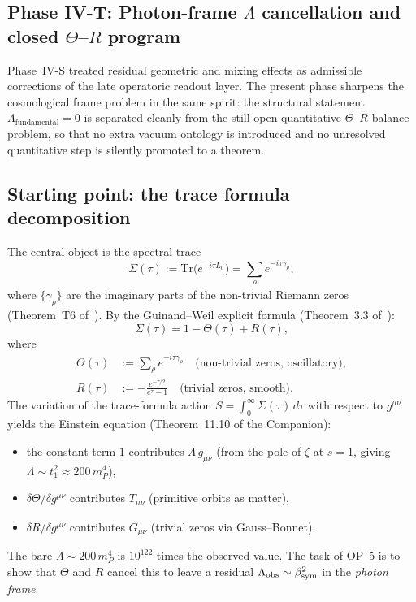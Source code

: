 \subsection*{Phase IV-T: Photon-frame $\Lambda$ cancellation and closed $\Theta$--$R$ program}
\label{sec:lambda_cancel}

\begin{remark}\label{rem:transition_s_to_t_closed}
Phase~IV-S treated residual geometric and mixing effects as admissible corrections of the late operatoric readout layer. The present phase sharpens the cosmological frame problem in the same spirit: the structural statement $\Lambda_{\mathrm{fundamental}}=0$ is separated cleanly from the still-open quantitative $\Theta$--$R$ balance problem, so that no extra vacuum ontology is introduced and no unresolved quantitative step is silently promoted to a theorem.
\end{remark}

\subsection{Starting point: the trace formula decomposition}

The central object is the spectral trace
\[
  \Sigma(\tau) := \mathrm{Tr}\!\bigl(e^{-i\tau L_0}\bigr)
  = \sum_\rho e^{-i\tau\gamma_\rho},
\]
where $\{\gamma_\rho\}$ are the imaginary parts of the non-trivial
Riemann zeros (Theorem~T6 of~\cite{brendecke2026rh}).
By the Guinand--Weil explicit formula (Theorem~3.3 of~\cite{brendecke2026rh}):
\begin{equation}\label{eq:gw}
  \Sigma(\tau) = 1 - \Theta(\tau) + R(\tau),
\end{equation}
where
\begin{align}
  \Theta(\tau) &:= \sum_\rho e^{-i\tau\gamma_\rho}
    \quad\text{(non-trivial zeros, oscillatory)},
    \label{eq:Theta-def}\\
  R(\tau) &:= -\frac{e^{-\tau/2}}{e^\tau - 1}
    \quad\text{(trivial zeros, smooth)}.
    \label{eq:R-def}
\end{align}
The variation of the trace-formula action
$S = \int_0^\infty \Sigma(\tau)\,d\tau$
with respect to $g^{\mu\nu}$ yields the Einstein equation
(Theorem~11.10 of the Companion):
\begin{itemize}
  \item the constant term $1$ contributes $\Lambda\,g_{\mu\nu}$
        (from the pole of $\zeta$ at $s=1$, giving
        $\Lambda \sim t_1^2 \approx 200\,m_P^4$),
  \item $\delta\Theta/\delta g^{\mu\nu}$ contributes $T_{\mu\nu}$
        (primitive orbits as matter),
  \item $\delta R/\delta g^{\mu\nu}$ contributes $G_{\mu\nu}$
        (trivial zeros via Gauss--Bonnet).
\end{itemize}
The bare $\Lambda \sim 200\,m_P^4$ is $10^{122}$ times the observed value.
The task of OP~5 is to show that $\Theta$ and $R$ cancel this to leave
a residual $\Lambda_{\mathrm{obs}} \sim \beta_{\mathrm{sym}}^2$ in the \emph{photon frame}.


